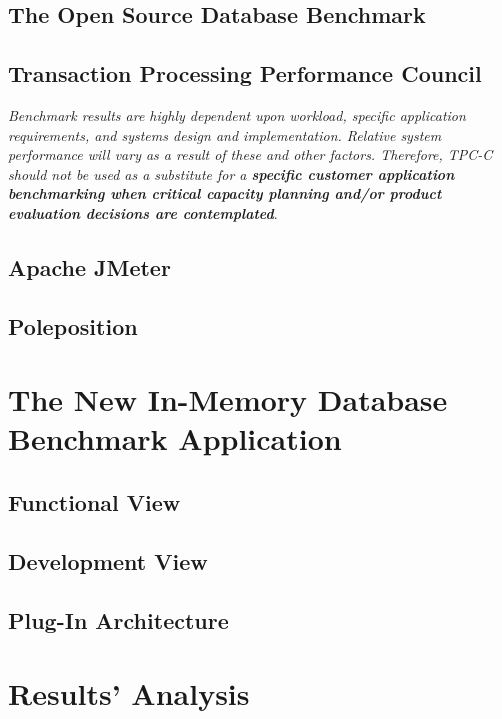 	\section{The Open Source Database Benchmark}
	\section{Transaction Processing Performance Council}
\emph{Benchmark results are highly dependent upon workload, specific application requirements, and systems design and implementation. Relative system performance will vary as a result of these and other factors. Therefore, TPC-C should not be used as a substitute for a \bfseries{specific customer application} benchmarking when critical capacity planning and/or product evaluation decisions are contemplated}\cite{TPC-C}.
	
	\section{Apache JMeter}
	\section{Poleposition}
	
\chapter{The New In-Memory Database Benchmark Application}
	\section{Functional View}
	\section{Development View}
	\section{Plug-In Architecture}

\chapter{Results' Analysis}
